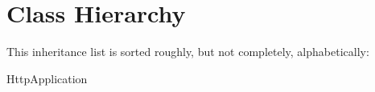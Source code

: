 \section{Class Hierarchy}
This inheritance list is sorted roughly, but not completely, alphabetically\+:\begin{DoxyCompactList}
\item Http\+Application\begin{DoxyCompactList}
\item {}
\end{DoxyCompactList}
\end{DoxyCompactList}

